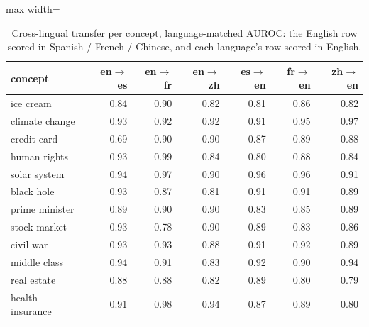 \begin{table}[t]
\centering
\footnotesize
\caption{Cross-lingual transfer per concept, language-matched AUROC: the English row scored in Spanish / French / Chinese, and each language's row scored in English.}
\label{tab:gen_xling_concepts}
\begin{adjustbox}{max width=\textwidth}
\begin{tabular}{lrrrrrr}
\toprule
concept & en$\to$es & en$\to$fr & en$\to$zh & es$\to$en & fr$\to$en & zh$\to$en \\
\midrule
ice cream & 0.84 & 0.90 & 0.82 & 0.81 & 0.86 & 0.82 \\
climate change & 0.93 & 0.92 & 0.92 & 0.91 & 0.95 & 0.97 \\
credit card & 0.69 & 0.90 & 0.90 & 0.87 & 0.89 & 0.88 \\
human rights & 0.93 & 0.99 & 0.84 & 0.80 & 0.88 & 0.84 \\
solar system & 0.94 & 0.97 & 0.90 & 0.96 & 0.96 & 0.91 \\
black hole & 0.93 & 0.87 & 0.81 & 0.91 & 0.91 & 0.89 \\
prime minister & 0.89 & 0.90 & 0.90 & 0.83 & 0.85 & 0.89 \\
stock market & 0.93 & 0.78 & 0.90 & 0.89 & 0.83 & 0.86 \\
civil war & 0.93 & 0.93 & 0.88 & 0.91 & 0.92 & 0.89 \\
middle class & 0.94 & 0.91 & 0.83 & 0.92 & 0.90 & 0.94 \\
real estate & 0.88 & 0.88 & 0.82 & 0.89 & 0.80 & 0.79 \\
health insurance & 0.91 & 0.98 & 0.94 & 0.87 & 0.89 & 0.80 \\
\bottomrule
\end{tabular}
\end{adjustbox}
\end{table}